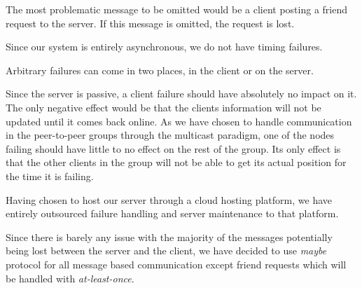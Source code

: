 The most problematic message to be omitted would be a client posting a friend request to the server. If this message is omitted, the request is lost.

Since our system is entirely asynchronous, we do not have timing failures.

Arbitrary failures can come in two places, in the client or on the server.
    
Since the server is passive, a client failure should have absolutely no impact on it. The only negative effect would be that the clients information will not be updated until it comes back online. As we have chosen to handle communication in the peer-to-peer groups through the multicast paradigm, one of the nodes failing should have little to no effect on the rest of the group. Its only effect is that the other clients in the group will not be able to get its actual position for the time it is failing.

Having chosen to host our server through a cloud hosting platform, we have entirely outsourced failure handling and server maintenance to that platform.

Since there is barely any issue with the majority of the messages potentially being lost between the server and the client, we have decided to use \textit{maybe} protocol for all message based communication except friend requests which will be handled with \textit{at-least-once}.






